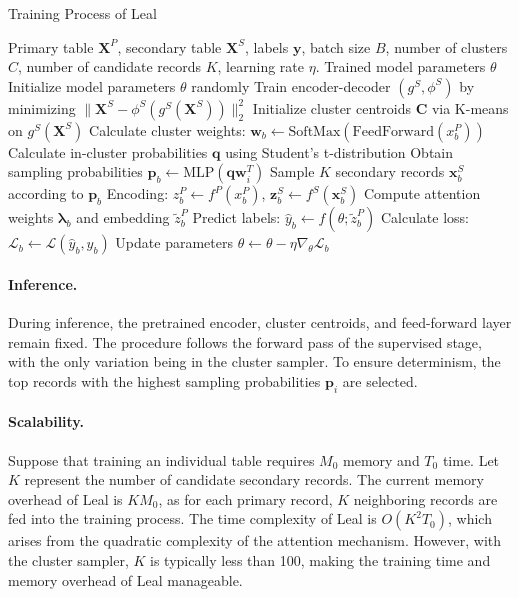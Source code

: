 \begin{algorithm}[t]
\caption{Training Process of Leal}
\label{alg:training}

\begin{algorithmic}[1]
\REQUIRE Primary table \(\mathbf{X}^P\), secondary table \(\mathbf{X}^S\), labels \(\mathbf{y}\), batch size \(B\), number of clusters \(C\), number of candidate records \(K\), learning rate \(\eta\).
\OUTPUT Trained model parameters \(\theta\)
\STATE Initialize model parameters \(\theta\) randomly
\STATE Train encoder-decoder \((g^S, \phi^S)\) by minimizing \(\|\mathbf{X}^S - \phi^S(g^S(\mathbf{X}^S))\|_2^2\)
\STATE Initialize cluster centroids \(\mathbf{C}\) via K-means on \(g^S(\mathbf{X}^S)\)
        \STATE Calculate cluster weights: \(\mathbf{w}_b \leftarrow \text{SoftMax}(\text{FeedForward}(x^P_b))\)
        \STATE Calculate in-cluster probabilities \(\mathbf{q}\) using Student's t-distribution
        \STATE Obtain sampling probabilities \(\mathbf{p}_b \leftarrow \mathrm{MLP}(\mathbf{q} \mathbf{w}_i^T)\)
        \STATE Sample \(K\) secondary records \(\mathbf{x}^S_b\) according to \(\mathbf{p}_b\)
        \STATE Encoding: \(z^P_b \leftarrow f^P(x^P_b)\), \(\mathbf{z}^S_b \leftarrow f^S(\mathbf{x}^S_b)\)
        \STATE Compute attention weights \(\boldsymbol{\lambda}_b\) and embedding \(\tilde{z}^P_b\)
        \STATE Predict labels: \(\hat{y}_b \leftarrow f(\theta; \tilde{z}^P_b)\)
        \STATE Calculate loss: \(\mathcal{L}_b \leftarrow \mathcal{L}(\hat{y}_b, y_b)\)
        \STATE Update parameters \(\theta \leftarrow \theta - \eta \nabla_{\theta} \mathcal{L}_b\)
    \ENDFOR
\ENDFOR
\end{algorithmic}
\end{algorithm}

\paragraph{Inference.} During inference, the pretrained encoder, cluster centroids, and feed-forward layer remain fixed. The procedure follows the forward pass of the supervised stage, with the only variation being in the cluster sampler. To ensure determinism, the top records with the highest sampling probabilities $\mathbf{p}_i$ are selected.


\paragraph{Scalability.} Suppose that training an individual table requires $M_0$ memory and $T_0$ time. Let $K$ represent the number of candidate secondary records. The current memory overhead of Leal is $K M_0$, as for each primary record, $K$ neighboring records are fed into the training process. The time complexity of Leal is $O(K^2 T_0)$, which arises from the quadratic complexity of the attention mechanism. However, with the cluster sampler, $K$ is typically less than 100, making the training time and memory overhead of Leal manageable.
